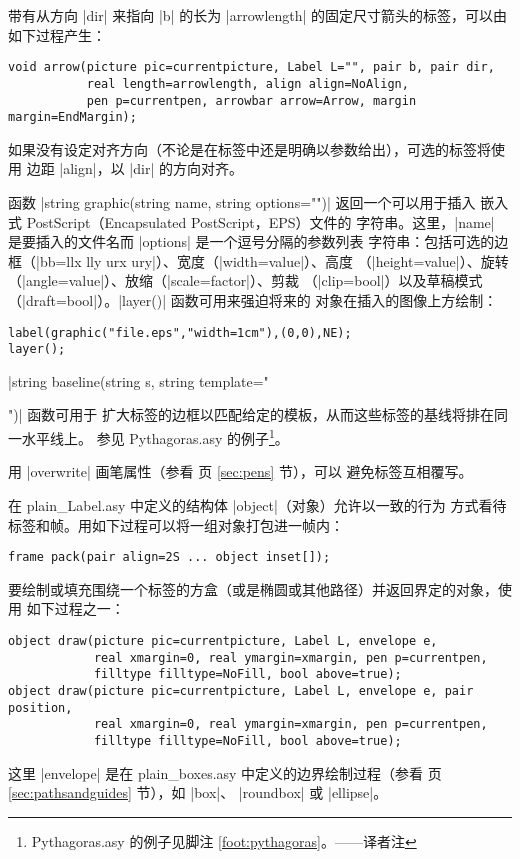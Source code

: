 \documentclass{ctexbook}
\newcommand*\prgname[1]{\textsf{#1}}
\newcommand\transnote[1]{\footnote{#1——译者注}}
\begin{document}
带有从方向 |dir| 来指向 |b| 的长为 |arrowlength| 的固定尺寸箭头的标签，可以由
如下过程产生：
\begin{lstlisting}
void arrow(picture pic=currentpicture, Label L="", pair b, pair dir,
           real length=arrowlength, align align=NoAlign,
           pen p=currentpen, arrowbar arrow=Arrow, margin margin=EndMargin);
\end{lstlisting}
如果没有设定对齐方向（不论是在标签中还是明确以参数给出），可选的标签将使用
边距 |align|，以 |dir| 的方向对齐。

函数 |string graphic(string name, string options="")| 返回一个可以用于插入
嵌入式 \prgname{PostScript}（Encapsulated \prgname{PostScript}，EPS）文件的
字符串。这里，|name| 是要插入的文件名而 |options| 是一个逗号分隔的参数列表
字符串：包括可选的边框（|bb=llx lly urx ury|）、宽度（|width=value|）、高度
（|height=value|）、旋转（|angle=value|）、放缩（|scale=factor|）、剪裁
（|clip=bool|）以及草稿模式（|draft=bool|）。|layer()| 函数可用来强迫将来的
对象在插入的图像上方绘制：
\begin{lstlisting}
label(graphic("file.eps","width=1cm"),(0,0),NE);
layer();
\end{lstlisting}

|string baseline(string s, string template="\strut")| 函数可用于
扩大标签的边框以匹配给定的模板，从而这些标签的基线将排在同一水平线上。
参见 \prgname{Pythagoras.asy} 的例子\transnote{\prgname{Pythagoras.asy}
的例子见脚注 \ref{foot:pythagoras}。}。

用 |overwrite| 画笔属性（参看 \pageref{sec:pens} 页 \ref{sec:pens} 节），可以
避免标签互相覆写。

在 \prgname{plain\_Label.asy} 中定义的结构体 |object|（对象）允许以一致的行为
方式看待标签和帧。用如下过程可以将一组对象打包进一帧内：
\begin{lstlisting}
frame pack(pair align=2S ... object inset[]);
\end{lstlisting}
要绘制或填充围绕一个标签的方盒（或是椭圆或其他路径）并返回界定的对象，使用
如下过程之一：
\begin{lstlisting}
object draw(picture pic=currentpicture, Label L, envelope e,
            real xmargin=0, real ymargin=xmargin, pen p=currentpen,
            filltype filltype=NoFill, bool above=true);
object draw(picture pic=currentpicture, Label L, envelope e, pair position,
            real xmargin=0, real ymargin=xmargin, pen p=currentpen,
            filltype filltype=NoFill, bool above=true);
\end{lstlisting}
这里 |envelope| 是在 \prgname{plain\_boxes.asy} 中定义的边界绘制过程（参看
\pageref{sec:pathsandguides} 页 \ref{sec:pathsandguides} 节），如 |box|、
|roundbox| 或 |ellipse|。
\end{document}
